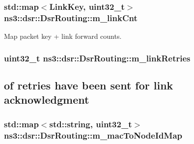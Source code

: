 \subsubsection[{\texorpdfstring{m\+\_\+link\+Cnt}{m_linkCnt}}]{\setlength{\rightskip}{0pt plus 5cm}std\+::map$<${\bf Link\+Key}, uint32\+\_\+t$>$ ns3\+::dsr\+::\+Dsr\+Routing\+::m\+\_\+link\+Cnt\hspace{0.3cm}{\ttfamily [private]}}\hypertarget{classns3_1_1dsr_1_1DsrRouting_a85ba159639f9bc13b3d8890458128a79}{}\label{classns3_1_1dsr_1_1DsrRouting_a85ba159639f9bc13b3d8890458128a79}


Map packet key + link forward counts. 

\subsubsection[{\texorpdfstring{m\+\_\+link\+Retries}{m_linkRetries}}]{\setlength{\rightskip}{0pt plus 5cm}uint32\+\_\+t ns3\+::dsr\+::\+Dsr\+Routing\+::m\+\_\+link\+Retries\hspace{0.3cm}{\ttfamily [private]}}\hypertarget{classns3_1_1dsr_1_1DsrRouting_a78b9a7405d3c905f57fa5aba63984d26}{}\label{classns3_1_1dsr_1_1DsrRouting_a78b9a7405d3c905f57fa5aba63984d26}


\subsection*{of retries have been sent for link acknowledgment}

\subsubsection[{\texorpdfstring{m\+\_\+mac\+To\+Node\+Id\+Map}{m_macToNodeIdMap}}]{\setlength{\rightskip}{0pt plus 5cm}std\+::map$<$std\+::string, uint32\+\_\+t$>$ ns3\+::dsr\+::\+Dsr\+Routing\+::m\+\_\+mac\+To\+Node\+Id\+Map\hspace{0.3cm}{\ttfamily [private]}}\hypertarget{classns3_1_1dsr_1_1DsrRouting_aadd597196a7816f0eca78f213a3aae44}{}\label{classns3_1_1dsr_1_1DsrRouting_aadd597196a7816f0eca78f213a3aae44}


